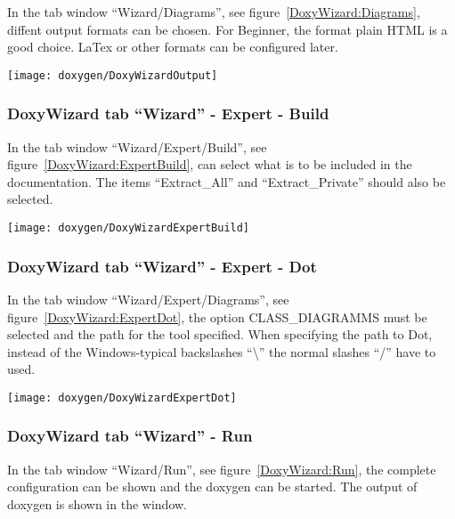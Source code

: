 In the tab window ``Wizard/Diagrams'', see figure~\ref{DoxyWizard:Diagrams}, diffent output formats can be chosen. For Beginner, the format plain HTML is a good choice. LaTex or other formats can be configured later.


\begin{center}
	\texttt{[image: doxygen/DoxyWizardOutput]}
	\label{DoxyWizard:Output}
\end{center} 

\subsubsection{DoxyWizard tab ``Wizard'' - Expert - Build }


In the tab window ``Wizard/Expert/Build'', see figure~\ref{DoxyWizard:ExpertBuild}, can select what is to be included in the documentation. The items ``Extract\_All'' and ``Extract\_Private'' should also be selected.

 
\begin{center}
	\texttt{[image: doxygen/DoxyWizardExpertBuild]}
	\label{DoxyWizard:ExpertBuild}
\end{center} 


\subsubsection{DoxyWizard tab ``Wizard'' - Expert - Dot}


In the tab window ``Wizard/Expert/Diagrams'', see figure~\ref{DoxyWizard:ExpertDot}, the option CLASS\_DIAGRAMMS must be selected and the path for the tool specified. When specifying the path to Dot, instead of the  Windows-typical backslashes ``\textbackslash'' the normal slashes ``/'' have to used.


\begin{center}
	\texttt{[image: doxygen/DoxyWizardExpertDot]}
	\label{DoxyWizard:ExpertDot}
\end{center} 


\subsubsection{DoxyWizard tab ``Wizard'' - Run}


In the tab window ``Wizard/Run'', see figure~\ref{DoxyWizard:Run}, the complete configuration can be shown and the doxygen can be started. The output of doxygen is shown in the window.





